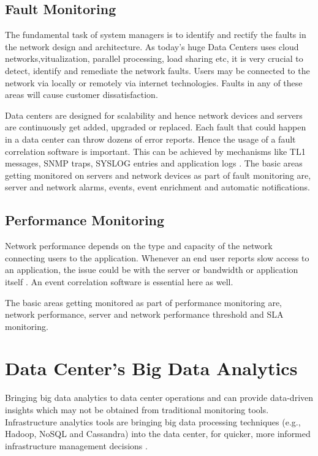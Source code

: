 \documentclass[sigconf]{acmart}
\begin{document}
\subsection{Fault Monitoring}

The fundamental task of system managers is to identify and rectify the faults in the network design and architecture. As today's huge Data Centers uses cloud networks,vitualization, parallel processing, load sharing etc, it is very crucial to detect, identify and remediate the network faults. Users may be connected to the network via locally or remotely via internet technologies. Faults in any of these areas will cause customer dissatisfaction. 

Data centers are designed for scalability and hence network devices and servers are continuously get added, upgraded or replaced. Each fault that could happen in a data center can throw dozens of error reports. Hence the usage of a fault correlation software is important. This can be achieved by mechanisms like TL1 messages, SNMP traps, SYSLOG entries and application logs \cite{network-fault-management-in-todays-complex-data-centers}. The basic areas getting monitored on servers and network devices as part of fault monitoring are, server and network alarms, events, event enrichment and automatic notifications.

\subsection{Performance Monitoring}

Network performance depends on the type and capacity of the network connecting users to the application. Whenever an end user reports slow access to an application, the issue could be with the server or bandwidth or application itself \cite{network-monitoring-datacenter-management}. An event correlation software is essential here as well.

The basic areas getting monitored as part of performance monitoring are, network performance, server and network performance threshold and SLA monitoring.

\section{Data Center's Big Data Analytics}

Bringing big data analytics to data center operations and can provide data-driven insights which may not be obtained from traditional monitoring tools. Infrastructure analytics tools are bringing big data processing techniques (e.g., Hadoop, NoSQL and Cassandra) into the data center, for quicker, more informed infrastructure management decisions \cite{IT-analytics-tools-bring-big-data-to-work-in-the-data-center}.
\end{document}
